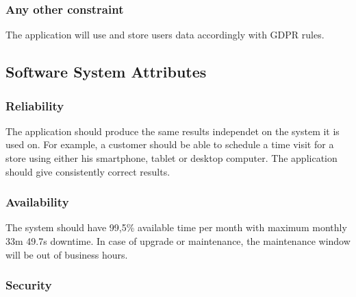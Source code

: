 \subsubsection{Any other constraint}


The application will use and store users data accordingly with GDPR rules.

\subsection{Software System Attributes}

\subsubsection{Reliability}


The application should produce the same results independet on the system it is used on. For example, a customer should be able to schedule a time visit for a store using either his smartphone, tablet or desktop computer. The application should give consistently correct results.

\subsubsection{Availability}


The system should have 99,5\% available time per month with maximum monthly 33m 49.7s downtime. In case of upgrade or maintenance, the maintenance window will be out of business hours.

\subsubsection{Security}

